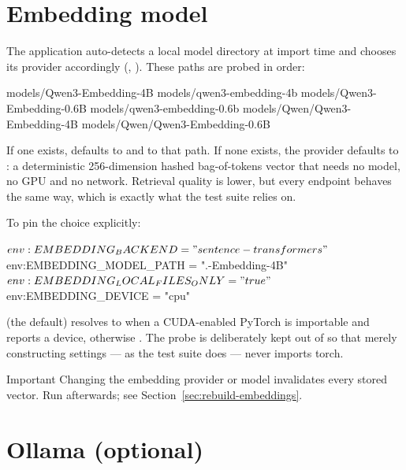 
\section{Embedding model}

The application auto-detects a local model directory at import time and chooses
its provider accordingly (,
). These paths are probed in order:

\begin{shellblock}
models/Qwen3-Embedding-4B
models/qwen3-embedding-4b
models/Qwen3-Embedding-0.6B
models/qwen3-embedding-0.6b
models/Qwen/Qwen3-Embedding-4B
models/Qwen/Qwen3-Embedding-0.6B
\end{shellblock}

If one exists,  defaults to
 and  to that path. If
none exists, the provider defaults to : a deterministic
256-dimension hashed bag-of-tokens vector that needs no model, no GPU and no
network. Retrieval quality is lower, but every endpoint behaves the same way,
which is exactly what the test suite relies on.

To pin the choice explicitly:

\begin{shellblock}
$env:EMBEDDING_BACKEND = "sentence-transformers"
$env:EMBEDDING_MODEL_PATH = ".\models{}-Embedding-4B"
$env:EMBEDDING_LOCAL_FILES_ONLY = "true"
$env:EMBEDDING_DEVICE = "cpu"
\end{shellblock}

 (the default) resolves to  when a
CUDA-enabled PyTorch is importable and reports a device, otherwise .
The probe is deliberately kept out of  so that merely
constructing settings --- as the test suite does --- never imports torch.

\begin{callout}{Important}
Changing the embedding provider or model invalidates every stored vector. Run
 afterwards; see
Section~\ref{sec:rebuild-embeddings}.
\end{callout}

\section{Ollama (optional)}


